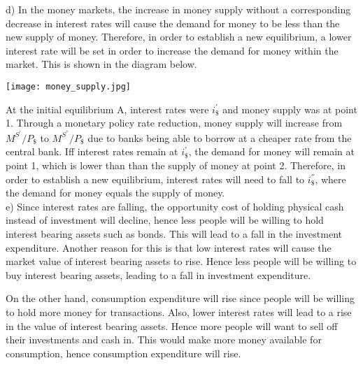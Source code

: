 \documentclass[12pt]{article}
\begin{document}
d) In the money markets, the increase in money supply without a corresponding decrease in interest rates will cause the demand for money to be less than the new supply of money. Therefore, in order to establish a new equilibrium, a lower interest rate will be set in order to increase the demand for money within the market. This is shown in the diagram below.

\begin{center}
	\texttt{[image: money\_supply.jpg]}
\end{center}

At the initial equilibrium A, interest rates were $i^{'}_{\$}$ and money supply was at point 1. Through a monetary policy rate reduction, money supply will increase from $M^{S^{'}}/P_{\$}$ to $M^{S^{''}}/P_{\$}$ due to banks being able to borrow at a cheaper rate from the central bank. Iff interest rates remain at $i^{'}_{\$}$, the demand for money will remain at point 1, which is lower than than the supply of money at point 2. Therefore, in order to establish a new equilibrium, interest rates will need to fall to $i^{''}_{\$}$, where the demand for money equals the supply of money.\\

e) Since interest rates are falling, the opportunity cost of holding physical cash instead of investment will decline, hence less people will be willing to hold interest bearing assets such as bonds. This will lead to a fall in the investment expenditure. Another reason for this is that low interest rates will cause the market value of interest bearing assets to rise. Hence less people will be willing to buy interest bearing assets, leading to a fall in investment expenditure.

On the other hand, consumption expenditure will rise since people will be willing to hold more money for transactions. Also, lower interest rates will lead to a rise in the value of interest bearing assets. Hence more people will want to sell off their investments and cash in. This would make more money available for consumption, hence consumption expenditure will rise.
\end{document}
